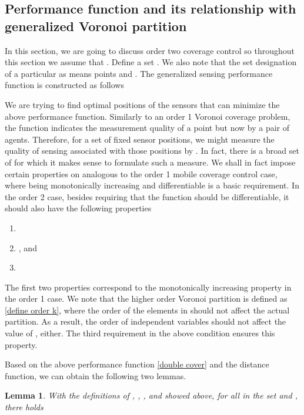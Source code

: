 \documentclass[letterpaper, 10 pt, conference]{ieeeconf}
\newtheorem{lemma}{Lemma}
\begin{document}
\subsection{Performance function and its relationship with generalized Voronoi partition}
In this section, we are going to discuss order two coverage control so throughout this section we assume that . Define a set . We also note that the set designation of a particular  as  means points  and .
The generalized sensing performance function  is constructed  as follows



We are trying to find optimal positions of the sensors that can minimize the above performance function.
Similarly to an order 1 Voronoi coverage problem, the function   indicates the measurement quality of a point  but now by a pair of agents.
Therefore, for a set of fixed sensor positions, we might measure the quality of sensing associated with those positions by .  In fact, there is a broad set of  for which it makes sense to formulate such a measure. We shall in fact impose certain properties on 
analogous to the order 1 mobile coverage control case, where  being monotonically increasing and differentiable is a basic requirement. In the order 2 case, besides requiring that the function  should be differentiable, it should also have the following properties

\begin{enumerate}
  \item  \\
  \item , and \\
  \item 
\end{enumerate}
The first two properties correspond to the monotonically increasing property in the order 1 case. We note that the higher order Voronoi partition is defined as
\eqref{define order k}, where the order of the elements in  should not affect the actual partition. As a result,  the order of independent variables should not affect the value of , either. The third requirement in the above condition ensures this property.


Based on the above performance function \eqref{double cover} and the distance function, we can obtain the following two lemmas.

\begin{lemma}
\label{lemma1} With the definitions of , ,  ,  and  showed above,
for all  in the set  and  , there holds 
\end{lemma}
\end{document}
